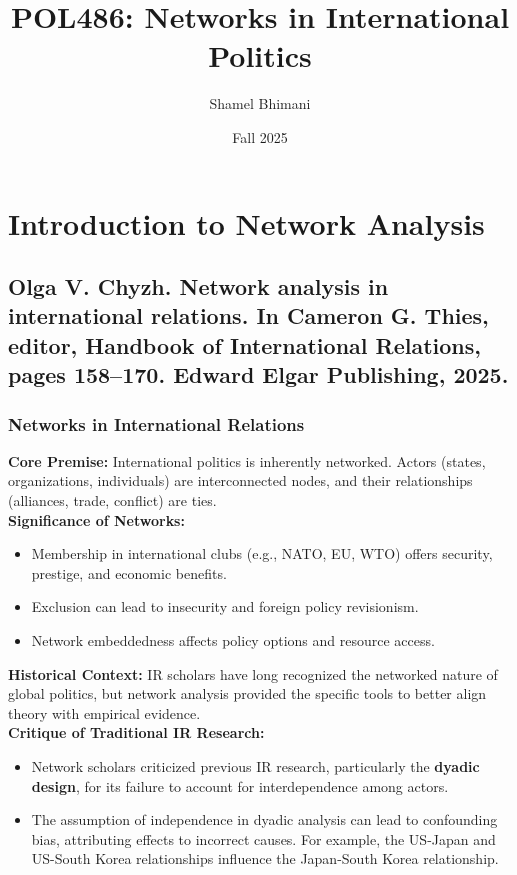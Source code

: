 \documentclass{article}
\title{POL486: Networks in International Politics}
\author{Shamel Bhimani}
\date{Fall 2025}
\begin{document}
\maketitle

\tableofcontents
\newpage

    \section{Introduction to Network Analysis}
    \subsection{Olga V. Chyzh. Network analysis in international relations. In Cameron G. Thies, editor, Handbook of International Relations, pages 158–170. Edward Elgar Publishing, 2025.}
    \subsubsection{Networks in International Relations}
    \noindent \textbf{Core Premise:} International politics is inherently
networked. Actors (states, organizations, individuals) are interconnected
nodes, and their relationships (alliances, trade, conflict) are ties.\\

    \noindent \textbf{Significance of Networks:}
    \begin{itemize}
        \item Membership in international clubs (e.g., NATO, EU, WTO) offers
        security, prestige, and economic benefits.
        \item Exclusion can lead to insecurity and foreign policy revisionism.
        \item Network embeddedness affects policy options and resource access.
    \end{itemize}

    \noindent \textbf{Historical Context:} IR scholars have long recognized
the networked nature of global politics, but network analysis provided the
specific tools to better align theory with empirical evidence.\\

    \noindent \textbf{Critique of Traditional IR Research:}
    \begin{itemize}
        \item Network scholars criticized previous IR research, particularly
        the \textbf{dyadic design}, for its failure to account for
        interdependence among actors.
        \item The assumption of independence in dyadic analysis can lead to
        confounding bias, attributing effects to incorrect causes. For
        example, the US-Japan and US-South Korea relationships influence the
        Japan-South Korea relationship.
    \end{itemize}
\end{document}
